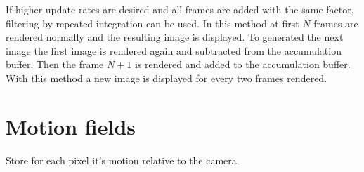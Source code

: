 If higher update rates are desired and all frames are added with the same factor, filtering by repeated integration can be used.\cite{Heckbert.1986}
In this method at first $N$ frames are rendered normally and the resulting image is displayed.
To generated the next image the first image is rendered again and subtracted from the accumulation buffer.
Then the frame $N+1$ is rendered and added to the accumulation buffer.
With this method a new image is displayed for every two frames rendered.\cite{Haeberli.1990}

\section{Motion fields}
Store for each pixel it's motion relative to the camera.
\cite{Rosado.2008}
\cite{Sousa.2008}